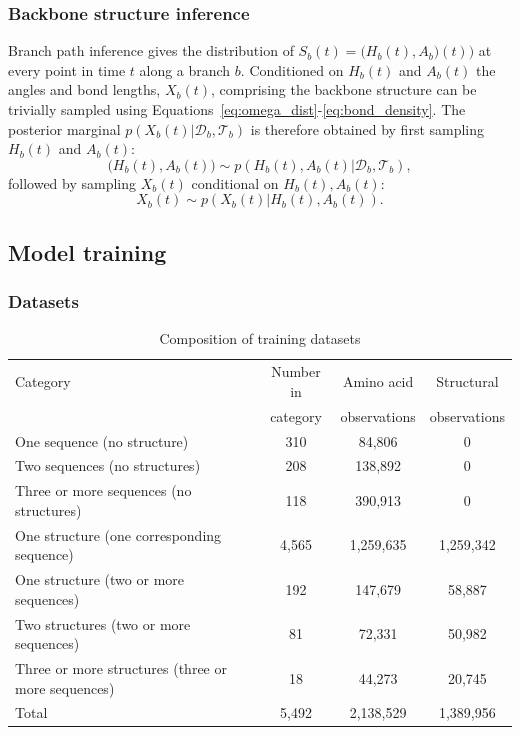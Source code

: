 \documentclass[nogrid]{MBE}%
\begin{document}
\subsubsection{Backbone structure inference}
Branch path inference gives the distribution of $S_{b}(t)=\big(H_{b}(t),A_{b}\big)(t))$ at every point in time $t$ along a branch $b$. Conditioned on $H_{b}(t)$ and $A_{b}(t)$ the angles and bond lengths, $X_{b}(t)$, comprising the backbone structure can be trivially sampled using Equations~\ref{eq:omega_dist}-\ref{eq:bond_density}. The posterior marginal $p(X_{b}(t)|\mathcal{D}_{b},\mathcal{T}_{b})$ is therefore obtained by first sampling $H_{b}(t)$ and $A_{b}(t)$:
\begin{equation}
\big(H_{b}(t),A_{b}(t)\big) \sim p(H_{b}(t),A_{b}(t)|\mathcal{D}_{b},\mathcal{T}_{b}),
\end{equation}
followed by sampling $X_{b}(t)$ conditional on $H_{b}(t),A_{b}(t)$:
\begin{equation}
X_{b}(t) \sim p(X_{b}(t)|H_{b}(t),A_{b}(t)).
\end{equation}

\subsection{Model training}

\subsubsection{Datasets}
\begin{table}%
	\centering
	\caption{\label{tab:datasets} Composition of training datasets}
	\begin{tabularx}{0.91\linewidth}{lccc}
		\toprule 
		Category & Number in & Amino acid & Structural\\
		& category & observations & observations\\
		\midrule
		One sequence (no structure) &  310 & 84,806 & 0\\
		Two sequences (no structures) & 208 & 138,892 & 0\\
		Three or more sequences (no structures) & 118 & 390,913 & 0\\
		One structure (one corresponding sequence) & 4,565 & 1,259,635 & 1,259,342\\
		One structure (two or more sequences) &  192 & 147,679 & 58,887\\
		Two structures (two or more sequences) &  81 & 72,331 & 50,982\\
		Three or more structures (three or more sequences) & 18 & 44,273 & 20,745\\
		\midrule
		Total & 5,492 & 2,138,529 & 1,389,956\\
		\bottomrule
	\end{tabularx}
\end{table}
\end{document}
